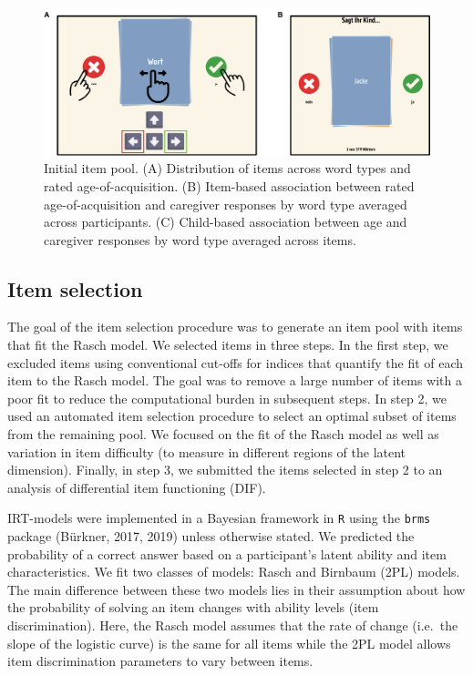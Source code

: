 \documentclass[
  man,floatsintext]{apa6}
\begin{document}
\begin{figure}

{\centering \includegraphics[width=1\linewidth]{../graphs/fig2} 

}

\caption{Initial item pool. (A) Distribution of items across word types and rated age-of-acquisition. (B) Item-based association between rated age-of-acquisition and caregiver responses by word type averaged across participants. (C) Child-based association between age and caregiver responses by word type averaged across items.}\label{fig:fig2}
\end{figure}

\hypertarget{item-selection}{%
\subsection{Item selection}\label{item-selection}}

The goal of the item selection procedure was to generate an item pool with items that fit the Rasch model. We selected items in three steps. In the first step, we excluded items using conventional cut-offs for indices that quantify the fit of each item to the Rasch model. The goal was to remove a large number of items with a poor fit to reduce the computational burden in subsequent steps. In step 2, we used an automated item selection procedure to select an optimal subset of items from the remaining pool. We focused on the fit of the Rasch model as well as variation in item difficulty (to measure in different regions of the latent dimension). Finally, in step 3, we submitted the items selected in step 2 to an analysis of differential item functioning (DIF).

IRT-models were implemented in a Bayesian framework in \texttt{R} using the \texttt{brms} package (Bürkner, 2017, 2019) unless otherwise stated. We predicted the probability of a correct answer based on a participant's latent ability and item characteristics. We fit two classes of models: Rasch and Birnbaum (2PL) models. The main difference between these two models lies in their assumption about how the probability of solving an item changes with ability levels (item discrimination). Here, the Rasch model assumes that the rate of change (i.e.~the slope of the logistic curve) is the same for all items while the 2PL model allows item discrimination parameters to vary between items.
\end{document}
